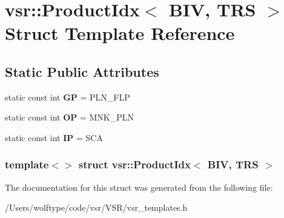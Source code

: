 \hypertarget{structvsr_1_1_product_idx_3_01_b_i_v_00_01_t_r_s_01_4}{\section{vsr\-:\-:Product\-Idx$<$ B\-I\-V, T\-R\-S $>$ Struct Template Reference}
\label{structvsr_1_1_product_idx_3_01_b_i_v_00_01_t_r_s_01_4}
}
\subsection*{Static Public Attributes}
\begin{DoxyCompactItemize}
\item 
\hypertarget{structvsr_1_1_product_idx_3_01_b_i_v_00_01_t_r_s_01_4_a8a98dce9e5128382fac1e07f169b017c}{static const int {\bfseries G\-P} = P\-L\-N\-\_\-\-F\-L\-P}\label{structvsr_1_1_product_idx_3_01_b_i_v_00_01_t_r_s_01_4_a8a98dce9e5128382fac1e07f169b017c}

\item 
\hypertarget{structvsr_1_1_product_idx_3_01_b_i_v_00_01_t_r_s_01_4_aec5e24bd5a3d44fea936ae476885fcfc}{static const int {\bfseries O\-P} = M\-N\-K\-\_\-\-P\-L\-N}\label{structvsr_1_1_product_idx_3_01_b_i_v_00_01_t_r_s_01_4_aec5e24bd5a3d44fea936ae476885fcfc}

\item 
\hypertarget{structvsr_1_1_product_idx_3_01_b_i_v_00_01_t_r_s_01_4_a2e4b1f5d158228f7e033420aae413904}{static const int {\bfseries I\-P} = S\-C\-A}\label{structvsr_1_1_product_idx_3_01_b_i_v_00_01_t_r_s_01_4_a2e4b1f5d158228f7e033420aae413904}

\end{DoxyCompactItemize}
\subsubsection*{template$<$$>$ struct vsr\-::\-Product\-Idx$<$ B\-I\-V, T\-R\-S $>$}



The documentation for this struct was generated from the following file\-:\begin{DoxyCompactItemize}
\item 
/\-Users/wolftype/code/vsr/\-V\-S\-R/vsr\-\_\-templates.\-h\end{DoxyCompactItemize}
